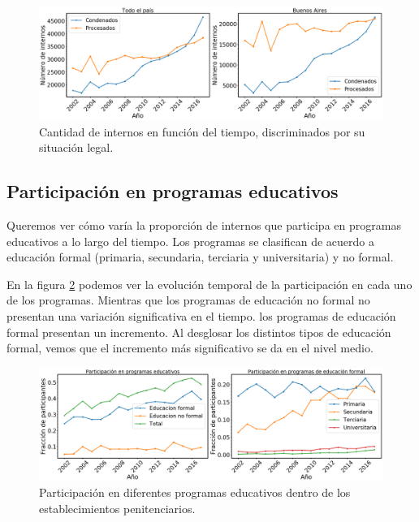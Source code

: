 \documentclass[10pt]{article}
\begin{document}
\begin{figure}[H]
	\centering
	\includegraphics[scale=0.26]{graficos/situacion_legal.png}
	\caption{Cantidad de internos en funci\'on del tiempo, discriminados por su situaci\'on legal. \label{fig:situacion_legal}}
\end{figure}


\subsection{Participación en programas educativos}

Queremos ver cómo varía la proporción de internos que participa en programas educativos a lo largo del tiempo. Los programas se clasifican de acuerdo a educaci\'on formal (primaria, secundaria, terciaria y universitaria) y no formal.

En la figura \ref{fig:educativos} podemos ver la evoluci\'on temporal de la participaci\'on en cada uno de los programas. Mientras que los programas de educaci\'on no formal no presentan una variaci\'on significativa en el tiempo. los programas de educaci\'on formal presentan un incremento. Al desglosar los distintos tipos de educaci\'on formal, vemos que el incremento m\'as significativo se da en el nivel medio.

\begin{figure}[H]
	\centering
	\includegraphics[scale=0.26]{graficos/participacion_educativos.png}
	\caption{Participaci\'on en diferentes programas educativos dentro de los establecimientos penitenciarios.\label{fig:educativos}}
\end{figure}
\end{document}
